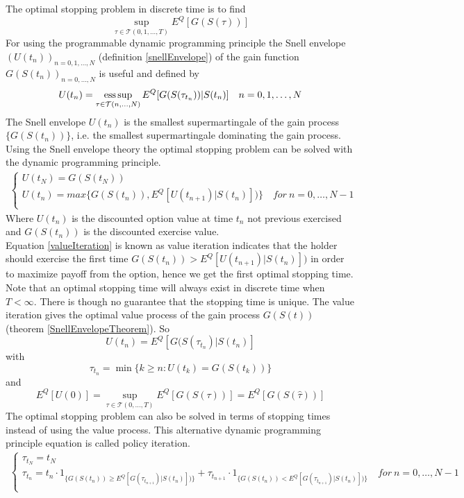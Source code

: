 The optimal stopping problem in discrete time is to find
\begin{equation}\label{Bermudanstop1}
\sup_{\tau \in \mathcal{T}(0,1,\ldots,T)} E^Q[G(S(\tau))]
\end{equation}
For using the programmable dynamic programming principle the Snell envelope $(U(t_{n}))_{n=0,1,\ldots, N}$ (definition \ref{snellEnvelope}) of the gain function $G(S(t_n))_{n=0,\ldots,N}$ is useful and defined by
$$U(t_n)=\operatorname*{ess\,sup}_{\tau \in \mathcal{T}(n,\ldots, N)} E^Q[G(S(\tau_{t_n}))|S(t_n)] \quad n=0,1, \ldots, N$$
The Snell envelope $U(t_n)$ is the smallest supermartingale of the gain process $\{G(S(t_n))\}$, i.e. the smallest supermartingale dominating the gain process. Using the Snell envelope theory the optimal stopping problem can be solved with the dynamic programming principle.
\begin{equation}\label{valueIteration}
\begin{split}
\begin{cases}
          U(t_{N}) = G(S(t_N))\\
          U(t_n) = max\{ G(S(t_n)), E^Q[U(t_{n+1})|S(t_n)])\} \quad for \ n={0,\ldots,N-1} \\ 
\end{cases}
\end{split}
\end{equation}
Where $U(t_n)$ is the discounted option value at time $t_n$ not previous exercised and $G(S(t_n))$ is the discounted exercise value.\\

Equation \eqref{valueIteration} is known as value iteration indicates that the holder should exercise the first time $G(S(t_n))> E^Q[U(t_{n+1})|S(t_n)])$ in order to maximize payoff from the option, hence we get the first optimal stopping time. Note that an optimal stopping time will always exist in discrete time when $T<\infty$. There is though no guarantee that the stopping time is unique. The value iteration gives the optimal value process of the gain process $G(S(t))$ (theorem \ref{SnellEnvelopeTheorem}). So 
$$U(t_n)=E^Q[G(S(\tau_{t_n})|S(t_n)]$$ with 
$$\tau_{t_n}=\min \{ k \geq n : U(t_k) = G(S(t_k)) \}$$ and 
$$E^Q[U(0)]= \sup_{\tau \in \mathcal{T}(0,\ldots, T)} E^Q[G(S(\tau))]=E^Q[G(S(\hat{\tau}))]$$ 
The optimal stopping problem can also be solved in terms of stopping times instead of using the value process. This alternative dynamic programming principle equation is called policy iteration.
\begin{equation}\label{policyIteration}
\begin{split}
\begin{cases}
          \tau_{t_N} = t_N\\
          \tau_{t_n} = t_n \cdot 1_{\{G(S(t_n)) \geq E^Q[G(\tau_{t_{n+1}})|S(t_n)])\}} + \tau_{t_{n+1}} \cdot 1_{\{G(S(t_n)) < E^Q[G(\tau_{t_{n+1}})|S(t_n)])\}} \quad for \ n={0,\ldots,N-1} \\ 
\end{cases}
\end{split}
\end{equation}


